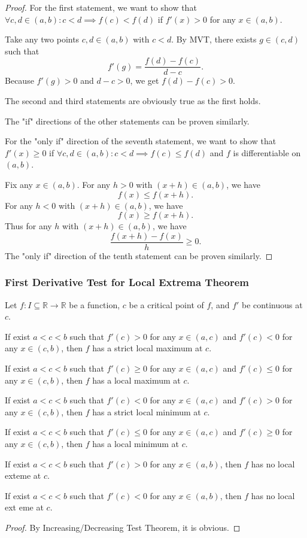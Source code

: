 \begin{proof}
    For the first statement, we want to show that $\forall c,d\in (a,b)\colon c<d\implies f(c)<f(d)$ if $f'(x)>0$ for any $x\in (a,b)$.

    Take any two points $c,d\in (a,b)$ with $c<d$. By MVT, there exists $g\in (c,d)$ such that
    \[f'(g)=\frac{f(d)-f(c)}{d-c}.\]
    Because $f'(g)>0$ and $d-c>0$, we get $f(d)-f(c)>0$.
    
    The second and third statements are obviously true as the first holds.
    
    The "if" directions of the other statements can be proven similarly.
    
    For the "only if" direction of the seventh statement, we want to show that $f'(x)\geq 0$ if $\forall c,d\in (a,b)\colon c<d\implies f(c)\leq f(d)$ and $f$ is differentiable on $(a,b)$.
    
    Fix any $x\in (a,b)$. For any $h>0$ with $(x+h)\in(a,b)$, we have
    \[f(x)\leq f(x+h).\]
    For any $h<0$ with $(x+h)\in(a,b)$, we have
    \[f(x)\geq f(x+h).\]
    Thus for any $h$ with $(x+h)\in(a,b)$, we have
    \[\frac{f(x+h)-f(x)}{h}\geq 0.\]
    The "only if" direction of the tenth statement can be proven similarly.
\end{proof}
\subsubsection{First Derivative Test for Local Extrema Theorem}
Let $f\colon I\subseteq\mathbb{R}\to\mathbb{R}$ be a function, $c$ be a critical point of $f$, and $f'$ be continuous at $c$.
\bit
\item If exist $a<c<b$ such that $f'(c)>0$ for any $x\in (a,c)$ and $f'(c)<0$ for any $x\in (c,b)$, then $f$ has a strict local maximum at $c$.
\item If exist $a<c<b$ such that $f'(c)\geq 0$ for any $x\in (a,c)$ and $f'(c)\leq 0$ for any $x\in (c,b)$, then $f$ has a local maximum at $c$.
\item If exist $a<c<b$ such that $f'(c)<0$ for any $x\in (a,c)$ and $f'(c)>0$ for any $x\in (c,b)$, then $f$ has a strict local minimum at $c$.
\item If exist $a<c<b$ such that $f'(c)\leq 0$ for any $x\in (a,c)$ and $f'(c)\geq 0$ for any $x\in (c,b)$, then $f$ has a local minimum at $c$.
\item If exist $a<c<b$ such that $f'(c)>0$ for any $x\in (a,b)$, then $f$ has no local exteme at $c$.
\item If exist $a<c<b$ such that $f'(c)<0$ for any $x\in (a,b)$, then $f$ has no local ext
eme at $c$.
\eit
\begin{proof}
    By Increasing/Decreasing Test Theorem, it is obvious.
\end{proof}
